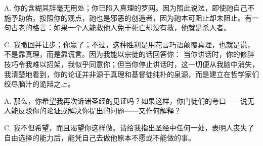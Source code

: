 A. 你的含糊其辞毫无用处；你已陷入真理的罗网。因为照此说法，即使祂自己不施予助佑，按照你的观点，祂也是邪恶的创造者，因为祂本可阻止却未阻止。有一句古老的格言：如果一个人能救他人免于死亡却没有救，他就是杀人者。\par

C. 我撤回并让步；你赢了；不过，这种胜利是用花言巧语颠覆真理，也就是说，不是靠真理，而是靠谎言。因为我能以宗徒的话回答你： 当你讲话时，你的修辞技巧令我难以招架，我似乎同意你；但当你停止讲话时，这一切便从我脑中消失，我清楚地看到，你的论证并非源于真理和基督徒纯朴的泉源，而是建立在哲学家们绞尽脑汁的诡辩之上。\par

A. 那么，你希望我再次诉诸圣经的见证吗？如果这样，你门徒们的夸口——说无人能反驳你的论证或解决你提出的问题——又作何解释？\par

C. 我不但希望，而且渴望你这样做。请给我指出圣经中任何一处，表明人丧失了自由选择的能力后，能凭自己去做他原本不愿或不能做的事。\par

